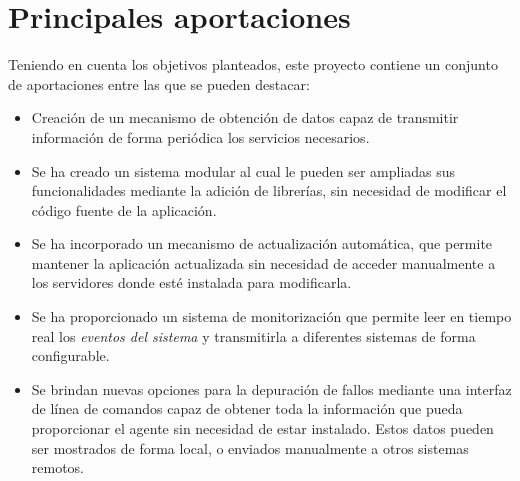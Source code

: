 \label{sec:conc}
\section{Principales aportaciones}
    Teniendo en cuenta los objetivos planteados, este proyecto contiene un conjunto de aportaciones entre las que se pueden destacar:
    
    \begin{itemize}
        \item Creación de un mecanismo de obtención de datos capaz de transmitir información de forma periódica los servicios necesarios.
        
        \item Se ha creado un sistema modular al cual le pueden ser ampliadas sus funcionalidades mediante la adición de librerías, sin necesidad de modificar el código fuente de la aplicación.
        
        \item Se ha incorporado un mecanismo de actualización automática, que permite mantener la aplicación actualizada sin necesidad de acceder manualmente a los servidores donde esté instalada para modificarla.
        
        \item Se ha proporcionado un sistema de monitorización que permite leer en tiempo real los \textit{eventos del sistema} y transmitirla a diferentes sistemas de forma configurable.
        
        \item Se brindan nuevas opciones para la depuración de fallos mediante una interfaz de línea de comandos capaz de obtener toda la información que pueda proporcionar el agente sin necesidad de estar instalado. Estos datos pueden ser mostrados de forma local, o enviados manualmente a otros sistemas remotos.
    \end{itemize}





